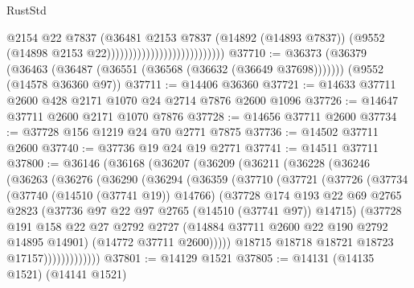 \begin{lexlean}{RustStd}
\begin{coremodule}
                                                    @2154
                                                    @22
                                                    @7837
                                                    (@36481
                                                      @2153
                                                      @7837
                                                      (@14892 (@14893 @7837))
                                                      (@9552
                                                        (@14898 @2153 @22)))))))))))))))))))))))))))
@37710 := @36373
    (@36379 (@36463 (@36487 (@36551 (@36568 (@36632 (@36649 @37698)))))))
    (@9552 (@14578 @36360 @97))
@37711 := @14406 @36360
@37721 := @14633 @37711 @2600 @428 @2171 @1070 @24 @2714 @7876 @2600 @1096
@37726 := @14647 @37711 @2600 @2171 @1070 @7876
@37728 := @14656 @37711 @2600
@37734 := @37728 @156 @1219 @24 @70 @2771 @7875
@37736 := @14502 @37711 @2600
@37740 := @37736 @19 @24 @19 @2771
@37741 := @14511 @37711
@37800 := @36146
    (@36168
      (@36207
        (@36209
          (@36211
            (@36228
              (@36246
                (@36263
                  (@36276
                    (@36290
                      (@36294
                        (@36359
                          (@37710
                            (@37721
                              (@37726
                                (@37734
                                  (@37740 (@14510 (@37741 @19)) @14766)
                                  (@37728
                                    @174
                                    @193
                                    @22
                                    @69
                                    @2765
                                    @2823
                                    (@37736 @97 @22 @97 @2765 (@14510 (@37741 @97)) @14715)
                                    (@37728
                                      @191
                                      @158
                                      @22
                                      @27
                                      @2792
                                      @2727
                                      (@14884 @37711 @2600 @22 @190 @2792 @14895 @14901)
                                      (@14772 @37711 @2600)))))
                              @18715
                              @18718
                              @18721
                              @18723
                              @17157)))))))))))))
@37801 := @14129 @1521
@37805 := @14131 (@14135 @1521) (@14141 @1521)

\end{coremodule}
\end{lexlean}
